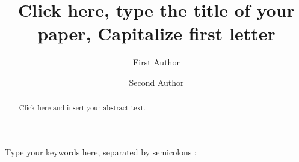 \documentclass[3p,times,procedia,twocolumn,twoside]{elsarticle}
\begin{document}
\begin{frontmatter}




\title{Click here, type the title of your paper, Capitalize first letter}


\author[a,*]{First Author}
\author[b]{Second Author}
\address[a]{First affiliation, Address, City and Postcode, Country}
\address[b]{Second affiliation, Address, City and Postcode, Country}


\begin{abstract}
Click here and insert your abstract text.
\end{abstract}

\begin{keyword}
Type your keywords here, separated by semicolons ;



\end{keyword}
\end{frontmatter}
\end{document}
